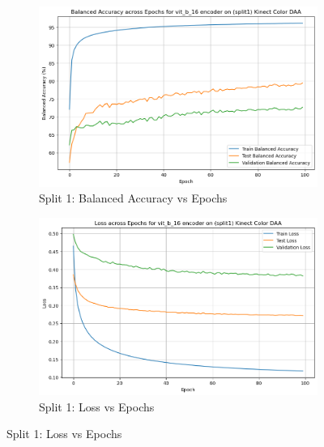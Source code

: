 \begin{figure}[htbp]
    \begin{subfigure}[b]{0.45\textwidth}
        \includegraphics[width=\textwidth]{Images_Thesis/Tensboard_runs_images_all/Experiment_00_Sup_D_A_no_Aug/Split_1/output_bal_acc_d_a_no_aug.png}
        \caption{Split 1: Balanced Accuracy vs Epochs}
        \label{fig:Exp_1_03}
    \end{subfigure}
    \hfill
    \begin{subfigure}[b]{0.45\textwidth}
        \includegraphics[width=\textwidth]{Images_Thesis/Tensboard_runs_images_all/Experiment_00_Sup_D_A_no_Aug/Split_1/output_loss_d_a_no_aug_split_1.png}
        \caption{Split 1:  Loss vs Epochs}
        \label{fig:Exp_1_04}
    \end{subfigure}


\end{figure}
